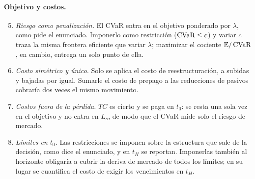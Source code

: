 \paragraph{Objetivo y costos.}
\begin{enumerate}\setcounter{enumi}{4}
  \item \emph{Riesgo como penalización.} El CVaR entra en el objetivo ponderado por $\lambda$, como pide el
  enunciado. Imponerlo como restricción ($\operatorname{CVaR} \le c$) y variar $c$ traza la misma frontera eficiente que
  variar $\lambda$; maximizar el cociente $\mathbb{E}/\operatorname{CVaR}$, en cambio, entrega un solo punto de ella.
  \item \emph{Costo simétrico y único.} Solo se aplica el costo de reestructuración, a subidas y bajadas por igual.
  Sumarle el costo de prepago a las reducciones de pasivos cobraría dos veces el mismo movimiento.
  \item \emph{Costos fuera de la pérdida.} $TC$ es cierto y se paga en $t_0$: se resta una sola vez en el objetivo y
  no entra en $L_s$, de modo que el CVaR mide solo el riesgo de mercado.
  \item \emph{Límites en $t_0$.} Las restricciones se imponen sobre la estructura que sale de la decisión, como
  dice el enunciado, y en $t_H$ se reportan. Imponerlas también al horizonte obligaría a cubrir la deriva de
  mercado de todos los límites; en su lugar se cuantifica el costo de exigir los vencimientos en $t_H$.
\end{enumerate}

